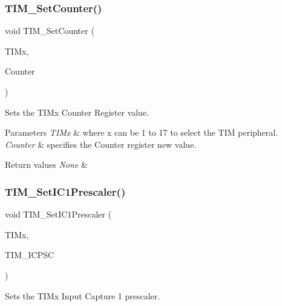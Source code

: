 \subsubsection{\texorpdfstring{TIM\_SetCounter()}{TIM\_SetCounter()}}
{\footnotesize\ttfamily void T\+I\+M\+\_\+\+Set\+Counter (\begin{DoxyParamCaption}\item[{\mbox{\hyperlink{struct_t_i_m___type_def}{T\+I\+M\+\_\+\+Type\+Def}} $\ast$}]{T\+I\+Mx,  }\item[{uint16\+\_\+t}]{Counter }\end{DoxyParamCaption})}



Sets the T\+I\+Mx Counter Register value. 


\begin{DoxyParams}{Parameters}
{\em T\+I\+Mx} & where x can be 1 to 17 to select the T\+IM peripheral. \\
\hline
{\em Counter} & specifies the Counter register new value. \\
\hline
\end{DoxyParams}

\begin{DoxyRetVals}{Return values}
{\em None} & \\
\hline
\end{DoxyRetVals}
\mbox{\label{group___t_i_m___exported___functions_gaf0f684dea88e222de9689d8ed0ca8805}} 
\subsubsection{\texorpdfstring{TIM\_SetIC1Prescaler()}{TIM\_SetIC1Prescaler()}}
{\footnotesize\ttfamily void T\+I\+M\+\_\+\+Set\+I\+C1\+Prescaler (\begin{DoxyParamCaption}\item[{\mbox{\hyperlink{struct_t_i_m___type_def}{T\+I\+M\+\_\+\+Type\+Def}} $\ast$}]{T\+I\+Mx,  }\item[{uint16\+\_\+t}]{T\+I\+M\+\_\+\+I\+C\+P\+SC }\end{DoxyParamCaption})}



Sets the T\+I\+Mx Input Capture 1 prescaler. 


